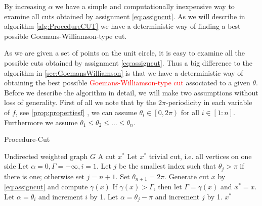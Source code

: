 \documentclass[12pt,a4paper]{article}
\theoremstyle{mythm}
\begin{document}
By increasing $ \alpha $ we have a simple and computationally inexpensive way to examine all cuts obtained by assignment \ref{eq:assigncut}.
As we will describe in algorithm \ref{alg:ProcedureCUT} we have a deterministic way of finding a best possible Goemans-Williamson-type cut. 

As we are given a set of points on the unit circle, it is easy to examine all the possible cuts obtained by assignment \ref{eq:assigncut}. 
Thus a big difference to the algorithm in \ref{sec:GoemansWilliamson} is that we have a deterministic way of obtaining the best possible \textcolor{red}{Goemans-Williamson-type
cut} associated to a given $ \theta $.
Before we describe the algorithm in detail, we will make two assumptions without loss of generality.
First of all we note that by the $ 2\pi $-periodicity in each variable of $ f $, see \ref{prop:propertiesf} , we can assume $ \theta_i \in \left[ 0,2\pi \right)  $ for all $ i
\in \left[ 1:n \right]  $.
Furthermore we assume $ \theta_1 \leq \theta_2 \leq \dots \leq \theta_n  $.
\begin{algorithm}
\caption{Procedure-Cut}
\label{alg:ProcedureCUT} 
\begin{algorithmic}[1]
\Require Undirected weighted graph $ G $
\Ensure A cut $ x^* $
\State Let $ x^* $ trivial cut, i.e. all vertices on one side
\State Let $ \alpha =0, \Gamma = -\infty , i =1 $. Let $ j $ be the smallest index such that $ \theta_j > \pi $ if there is one; otherwise set $ j = n+1 $. Set $ \theta _{ n+1
} = 2\pi $.
\While{ $ \alpha < \pi $}
\State Generate cut $ x $ by \ref{eq:assigncut} and compute $ \gamma (x) $
\label{gencut} 
\State If $ \gamma (x) > \Gamma $, then let $ \Gamma = \gamma (x) $ and $ x^* = x $.
  \State Let $ \alpha = \theta_i $ and increment $ i $ by 1.
\Else 
\State Let $ \alpha = \theta_j - \pi $ and increment $ j $ by 1.
\EndIf
\EndWhile
\State \Return $ x ^{ * }  $
\end{algorithmic}
\end{algorithm}
\end{document}
